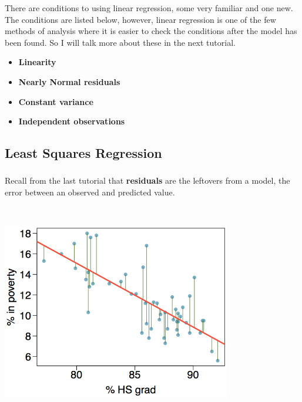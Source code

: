 \documentclass[]{article}
\begin{document}
There are conditions to using linear regression, some very familiar and
one new. The conditions are listed below, however, linear regression is
one of the few methods of analysis where it is easier to check the
conditions after the model has been found. So I will talk more about
these in the next tutorial.

\begin{itemize}
\item
  \textbf{Linearity}
\item
  \textbf{Nearly Normal residuals}
\item
  \textbf{Constant variance}
\item
  \textbf{Independent observations}
\end{itemize}

\hypertarget{least-squares-regression}{%
\subsection{Least Squares Regression}\label{least-squares-regression}}

\hypertarget{section-1}{%
\subsubsection{\texorpdfstring{\href{}{}}{}}\label{section-1}}

Recall from the last tutorial that \textbf{residuals} are the leftovers
from a model, the error between an observed and predicted value.

~

\includegraphics[width=0.75\textwidth,height=\textheight]{images/all_residuals.png}

\hypertarget{section-2}{%
\subsubsection{\texorpdfstring{\href{}{}}{}}\label{section-2}}
\end{document}
